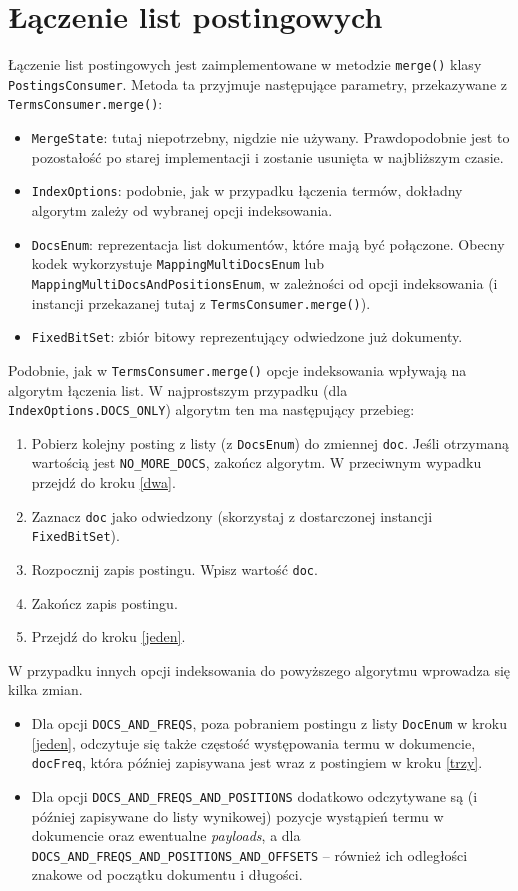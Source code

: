 \section{Łączenie list postingowych}

Łączenie list postingowych jest zaimplementowane w metodzie \texttt{merge()} klasy \texttt{PostingsConsumer}. Metoda ta przyjmuje następujące parametry, przekazywane z \texttt{TermsConsumer.merge()}:
\begin{itemize}
 \item \texttt{MergeState}: tutaj niepotrzebny, nigdzie nie używany. Prawdopodobnie jest to pozostałość po starej implementacji i zostanie usunięta w najbliższym czasie.
 \item \texttt{IndexOptions}: podobnie, jak w przypadku łączenia termów, dokładny algorytm zależy od wybranej opcji indeksowania.
 \item \texttt{DocsEnum}: reprezentacja list dokumentów, które mają być połączone. Obecny kodek wykorzystuje \texttt{MappingMultiDocsEnum} lub \texttt{MappingMultiDocsAndPositionsEnum}, w zależności od opcji indeksowania (i instancji przekazanej tutaj z \texttt{TermsConsumer.merge()}). 
 \item \texttt{FixedBitSet}: zbiór bitowy reprezentujący odwiedzone już dokumenty.
\end{itemize}

Podobnie, jak w \texttt{TermsConsumer.merge()} opcje indeksowania wpływają na algorytm łączenia list. W najprostszym przypadku (dla \texttt{IndexOptions.DOCS\_ONLY}) algorytm ten ma następujący przebieg:
\begin{enumerate}
 \item \label{jeden} Pobierz kolejny posting z listy (z \texttt{DocsEnum}) do zmiennej \texttt{doc}. Jeśli otrzymaną wartością jest \texttt{NO\_MORE\_DOCS}, zakończ algorytm. W przeciwnym wypadku przejdź do kroku \ref{dwa}.
 \item \label{dwa} Zaznacz \texttt{doc} jako odwiedzony (skorzystaj z dostarczonej instancji \texttt{FixedBitSet}).
 \item \label{trzy} Rozpocznij zapis postingu. Wpisz wartość \texttt{doc}.
 \item Zakończ zapis postingu.
 \item Przejdź do kroku \ref{jeden}.
\end{enumerate}

W przypadku innych opcji indeksowania do powyższego algorytmu wprowadza się kilka zmian.
\begin{itemize}
 \item Dla opcji \texttt{DOCS\_AND\_FREQS}, poza pobraniem postingu z listy \texttt{DocEnum} w kroku \ref{jeden}, odczytuje się także częstość występowania termu w dokumencie, \texttt{docFreq}, która później zapisywana jest wraz z postingiem w kroku \ref{trzy}.
 \item Dla opcji \texttt{DOCS\_AND\_FREQS\_AND\_POSITIONS} dodatkowo odczytywane są (i później zapisywane do listy wynikowej) pozycje wystąpień termu w dokumencie oraz ewentualne \emph{payloads}, a dla \texttt{DOCS\_AND\_FREQS\_AND\_POSITIONS\_AND\_OFFSETS} -- również ich odległości znakowe od początku dokumentu i długości.
\end{itemize}

